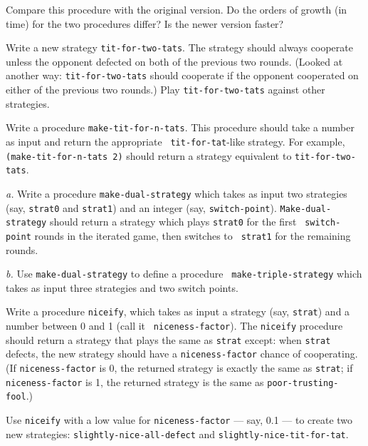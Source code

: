 Compare this procedure with the original version. Do the orders of
growth (in time) for the two procedures differ? Is the newer version
faster?

\goodbreak
\vskip 8pt


Write a new strategy {\tt tit-for-two-tats}. The strategy should always
cooperate unless the opponent defected on both of the previous two
rounds. (Looked at another way: {\tt tit-for-two-tats} should cooperate if
the opponent cooperated on either of the previous two rounds.) Play
{\tt tit-for-two-tats} against other strategies.


\vskip 8pt


Write a procedure {\tt make-tit-for-n-tats}. This procedure should
take a number as input and return the appropriate {\tt
tit-for-tat}-like strategy.  For example, {\tt (make-tit-for-n-tats
2)} should return a strategy equivalent to {\tt tit-for-two-tats}.


\vskip 8pt


{\it a.} Write a procedure {\tt make-dual-strategy} which takes as
input two strategies (say, {\tt strat0} and {\tt strat1}) and an
integer (say, {\tt switch-point}). {\tt Make-dual-strategy} should
return a strategy which plays {\tt strat0} for the first {\tt
switch-point} rounds in the iterated game, then switches to {\tt
strat1} for the remaining rounds.

{\it b.} Use {\tt make-dual-strategy} to define a procedure {\tt
make-triple-strategy} which takes as input three strategies and two
switch points.


\vskip 8pt


Write a procedure {\tt niceify}, which takes as input a strategy (say,
{\tt strat}) and a number between 0 and 1 (call it {\tt
niceness-factor}). The {\tt niceify} procedure should return a
strategy that plays the same as {\tt strat} except: when {\tt strat}
defects, the new strategy should have a {\tt niceness-factor}
chance of cooperating.  (If {\tt niceness-factor} is 0, the returned
strategy is exactly the same as {\tt strat}; if {\tt niceness-factor}
is 1, the returned strategy is the same as {\tt poor-trusting-fool}.)

Use {\tt niceify} with a low value for {\tt niceness-factor} --- say,
0.1 --- to create two new strategies: {\tt slightly-nice-all-defect}
and {\tt slightly-nice-tit-for-tat}.

